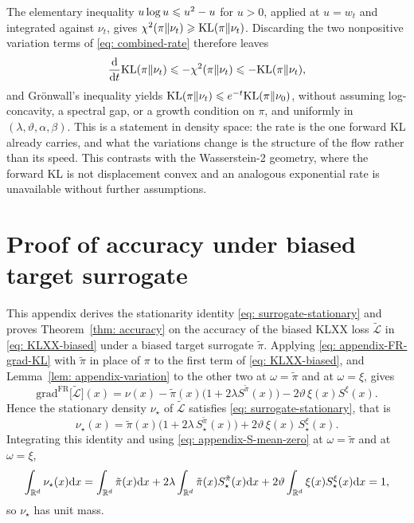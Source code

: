 \documentclass{article}
\begin{document}
The elementary inequality $u\log u\leqslant u^2-u$ for $u>0$, applied at $u=w_t$ and integrated against $\nu_t$, gives $\chi^2(\pi\|\nu_t)\geqslant\mathrm{KL}(\pi\|\nu_t)$. Discarding the two nonpositive variation terms of \eqref{eq: combined-rate} therefore leaves
\begin{equation*}
    \frac{\mathrm{d}}{\mathrm{d} t}\mathrm{KL}(\pi\|\nu_t) \leqslant -\chi^2(\pi\|\nu_t) \leqslant -\mathrm{KL}(\pi\|\nu_t) ,
\end{equation*}
and Gr\"onwall's inequality yields $\mathrm{KL}(\pi\|\nu_t)\leqslant e^{-t}\mathrm{KL}(\pi\|\nu_0)$, without assuming log-concavity, a spectral gap, or a growth condition on $\pi$, and uniformly in $(\lambda,\vartheta,\alpha,\beta)$. This is a statement in density space: the rate is the one forward KL already carries, and what the variations change is the structure of the flow rather than its speed. This contrasts with the Wasserstein-2 geometry, where the forward KL is not displacement convex and an analogous exponential rate is unavailable without further assumptions.

\section{Proof of accuracy under biased target surrogate}
\label{sec: appendix-accuracy}

This appendix derives the stationarity identity \eqref{eq: surrogate-stationary} and proves Theorem~\ref{thm: accuracy} on the accuracy of the biased KLXX loss $\tilde{\mathcal L}$ in \eqref{eq: KLXX-biased} under a biased target surrogate $\tilde\pi$. Applying \eqref{eq: appendix-FR-grad-KL} with $\tilde\pi$ in place of $\pi$ to the first term of \eqref{eq: KLXX-biased}, and Lemma~\ref{lem: appendix-variation} to the other two at $\omega=\tilde\pi$ and at $\omega=\xi$, gives
\begin{equation*}
    \mathrm{grad}^{\mathrm{FR}}\bigl[\tilde{\mathcal L}\bigr](x) = \nu(x) - \tilde\pi(x)\bigl(1+2\lambda S^{\tilde\pi}(x)\bigr) - 2\vartheta\,\xi(x)S^{\xi}(x) .
\end{equation*}
Hence the stationary density $\nu_\star$ of $\tilde{\mathcal L}$ satisfies \eqref{eq: surrogate-stationary}, that is
\begin{equation*}
	\nu_\star(x) = \tilde\pi(x)\bigl(1 + 2\lambda\,S^{\tilde\pi}_\star(x)\bigr) + 2\vartheta\,\xi(x)\,S^{\xi}_\star(x) .
\end{equation*}
Integrating this identity and using \eqref{eq: appendix-S-mean-zero} at $\omega=\tilde\pi$ and at $\omega=\xi$,
\begin{equation*}
	\int_{\mathbb R^d} \nu_\star(x)\mathrm{d} x = \int_{\mathbb R^d} \tilde\pi(x)\mathrm{d} x
	+2\lambda\int_{\mathbb R^d} \tilde\pi(x)S^{\tilde\pi}_\star(x)\mathrm{d} x +
	2\vartheta\int_{\mathbb R^d}\xi(x)S^{\xi}_\star(x)\mathrm{d} x = 1 ,
\end{equation*}
so $\nu_\star$ has unit mass.
\end{document}
